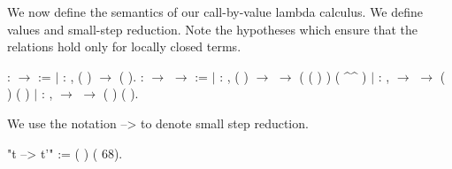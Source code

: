 \documentclass[12pt]{report}
\begin{document}
 We now define the semantics of our call-by-value lambda calculus. 
    We define values and small-step reduction. Note the hypotheses 
    which ensure that the relations hold only for locally closed terms. \begin{coqdoccode}
\coqdocemptyline
\coqdocnoindent
{}  :  \ensuremath{\rightarrow}  :=\coqdoceol
\coqdocindent{1.00em}
\ensuremath{|}  : \coqdockw{\ensuremath{\forall}} , \coqdoceol
\coqdocindent{3.00em}
 ( ) \ensuremath{\rightarrow}  ( ).\coqdoceol
\coqdocemptyline
\coqdocnoindent
{}  :  \ensuremath{\rightarrow}  \ensuremath{\rightarrow}  :=\coqdoceol
\coqdocindent{1.00em}
\ensuremath{|}  : \coqdockw{\ensuremath{\forall}}  ,\coqdoceol
\coqdocindent{3.00em}
 ( ) \ensuremath{\rightarrow}\coqdoceol
\coqdocindent{3.00em}
  \ensuremath{\rightarrow}\coqdoceol
\coqdocindent{3.00em}
 ( ( ) ) ( \^{}\^{} )\coqdoceol
\coqdocindent{1.00em}
\ensuremath{|}  : \coqdockw{\ensuremath{\forall}}   ,\coqdoceol
\coqdocindent{3.00em}
  \ensuremath{\rightarrow}\coqdoceol
\coqdocindent{3.00em}
   \ensuremath{\rightarrow}\coqdoceol
\coqdocindent{3.00em}
 (  ) (  )\coqdoceol
\coqdocindent{1.00em}
\ensuremath{|}  : \coqdockw{\ensuremath{\forall}}   ,\coqdoceol
\coqdocindent{3.00em}
  \ensuremath{\rightarrow}\coqdoceol
\coqdocindent{3.00em}
   \ensuremath{\rightarrow}\coqdoceol
\coqdocindent{3.00em}
 (  ) (  ).\coqdoceol
\coqdocemptyline
\end{coqdoccode}
We use the notation  -->  to denote small step reduction. \begin{coqdoccode}
\coqdocemptyline
\coqdocnoindent
{} "t --> t'" := (  ) (  68).\coqdoceol
\coqdocemptyline
\end{coqdoccode}
\end{document}
